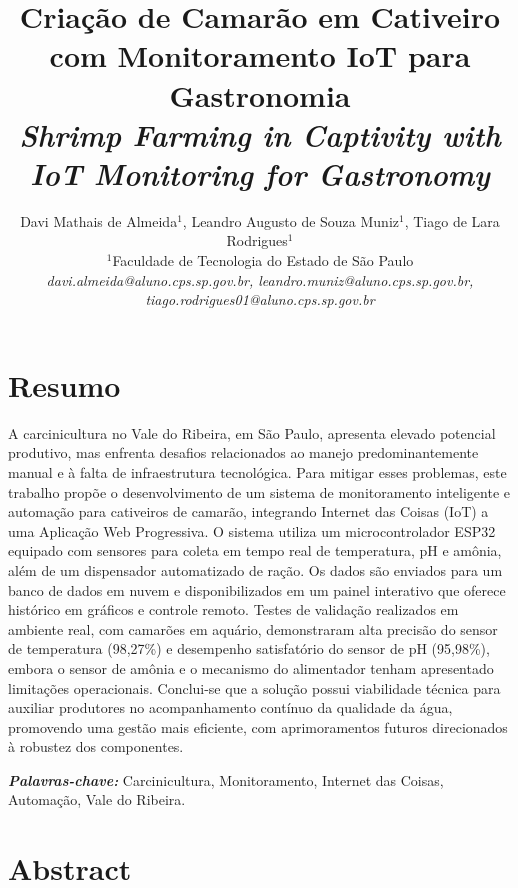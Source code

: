\documentclass[11pt,a4paper]{article}
\title{\vspace{0.6cm}\textbf{\large Criação de Camarão em Cativeiro com Monitoramento IoT para Gastronomia} \\[0.2cm]
\large \textit{Shrimp Farming in Captivity with IoT Monitoring for Gastronomy}}
\author{
    Davi Mathais de Almeida$^{1}$, Leandro Augusto de Souza Muniz$^{1}$, Tiago de Lara Rodrigues$^{1}$ \\[0.3cm]
    \small
    $^{1}$Faculdade de Tecnologia do Estado de São Paulo \\
    \textit{davi.almeida@aluno.cps.sp.gov.br, leandro.muniz@aluno.cps.sp.gov.br,} \\
    \textit{tiago.rodrigues01@aluno.cps.sp.gov.br}
}
\date{}
\begin{document}
\pagestyle{fancy}

\maketitle
\thispagestyle{fancy}

\section*{Resumo}

A carcinicultura no Vale do Ribeira, em São Paulo, apresenta elevado potencial produtivo, mas enfrenta desafios relacionados ao manejo predominantemente manual e à falta de infraestrutura tecnológica. Para mitigar esses problemas, este trabalho propõe o desenvolvimento de um sistema de monitoramento inteligente e automação para cativeiros de camarão, integrando Internet das Coisas (IoT) a uma Aplicação Web Progressiva. O sistema utiliza um microcontrolador ESP32 equipado com sensores para coleta em tempo real de temperatura, pH e amônia, além de um dispensador automatizado de ração. Os dados são enviados para um banco de dados em nuvem e disponibilizados em um painel interativo que oferece histórico em gráficos e controle remoto. Testes de validação realizados em ambiente real, com camarões em aquário, demonstraram alta precisão do sensor de temperatura (98,27\%) e desempenho satisfatório do sensor de pH (95,98\%), embora o sensor de amônia e o mecanismo do alimentador tenham apresentado limitações operacionais. Conclui-se que a solução possui viabilidade técnica para auxiliar produtores no acompanhamento contínuo da qualidade da água, promovendo uma gestão mais eficiente, com aprimoramentos futuros direcionados à robustez dos componentes.

\vspace{0.3cm}
\noindent\textit{\textbf{Palavras-chave:}} Carcinicultura, Monitoramento, Internet das Coisas, Automação, Vale do Ribeira.

\section*{Abstract}
\end{document}
